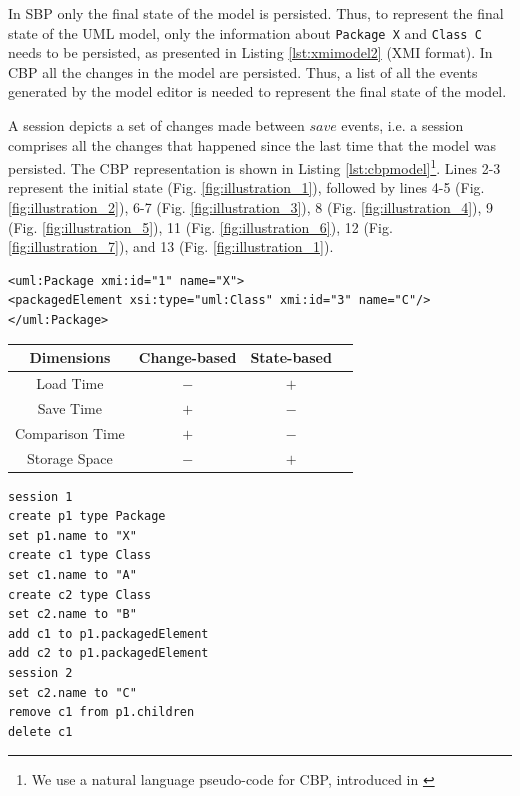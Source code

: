 \documentclass{llncs}
\begin{document}
In SBP only the final state of the model is persisted. Thus, to represent the final state of the UML model, only the information about \texttt{Package X} and \texttt{Class C} needs to be persisted, as presented in Listing \ref{lst:xmimodel2} (XMI format). In CBP all the changes in the model are persisted. Thus, a list of all the events generated by the model editor is needed to represent the final state of the model.

A session depicts a set of changes made between $save$ events, i.e. a session comprises all the changes that happened since the last time that the model was persisted. The CBP representation is shown in Listing \ref{lst:cbpmodel}\footnote{We use a natural language pseudo-code for CBP, introduced in \cite{DBLP:conf/models/YohannisKP17,yohannis2018towards}}. Lines 2-3 represent the initial state (Fig. \ref{fig:illustration_1}), followed by lines 4-5 (Fig. \ref{fig:illustration_2}), 6-7 (Fig. \ref{fig:illustration_3}), 8 (Fig. \ref{fig:illustration_4}), 9 (Fig. \ref{fig:illustration_5}), 11 (Fig. \ref{fig:illustration_6}), 12 (Fig. \ref{fig:illustration_7}), and 13 (Fig. \ref{fig:illustration_1}). 

\begin{minipage}[t]{0.59\linewidth}
\begin{lstlisting}[style=xmi,caption={The second version of the UML2 example model.},label=lst:xmimodel2]
<uml:Package xmi:id="1" name="X">
<packagedElement xsi:type="uml:Class" xmi:id="3" name="C"/>
</uml:Package>
\end{lstlisting}

\centering
{}
\label{table:persistence_comparsion}
\begin{small}
\begin{tabular}{ c c c c }
    \hline 
    \textbf{Dimensions} & \textbf{Change-based} & \textbf{State-based} \\
    \hline 
    Load Time & $-$ & $+$ \\
    Save Time & $+$ & $-$ \\
    Comparison Time & $+$ & $-$ \\
    Storage Space & $-$ & $+$ \\
    \hline 
\end{tabular}
\end{small}
\end{minipage}
\hfill
\begin{minipage}[t]{0.39\linewidth}
\begin{lstlisting}[style=eol,caption={The text CBP of producing state-based model in List. \ref{lst:xmimodel2}. Its visual illustration is in Fig. \ref{fig:illustration_cbp}.},label=lst:cbpmodel]
session 1
create p1 type Package
set p1.name to "X" 
create c1 type Class
set c1.name to "A"
create c2 type Class
set c2.name to "B"
add c1 to p1.packagedElement 
add c2 to p1.packagedElement
session 2
set c2.name to "C"
remove c1 from p1.children 
delete c1
\end{lstlisting}
\end{minipage}
 
\end{document}
